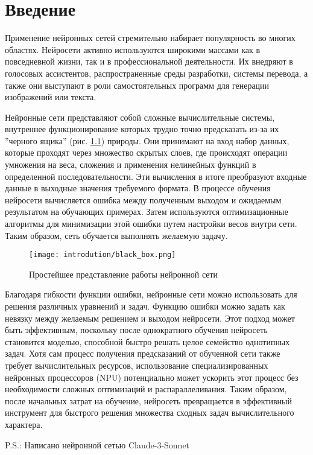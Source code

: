 \chapter{Введение}

Применение нейронных сетей стремительно набирает популярность во многих областях.
Нейросети активно используются широкими массами как в повседневной жизни, так и в
профессиональной деятельности. Их внедряют в голосовых ассистентов, распространенные
среды разработки, системы перевода, а также они выступают в роли самостоятельных
программ для генерации изображений или текста.

Нейронные сети представляют собой сложные вычислительные системы, внутреннее
функционирование которых трудно точно предсказать из-за их ''черного ящика''
(рис. \ref{fig:black_box}) природы. Они принимают на вход набор данных, которые
проходят через множество скрытых слоев, где происходят операции умножения на веса,
сложения и применения нелинейных функций в определенной последовательности.
Эти вычисления в итоге преобразуют входные данные в выходные значения требуемого
формата. В процессе обучения нейросети вычисляется ошибка между полученным выходом
и ожидаемым результатом на обучающих примерах. Затем используются оптимизационные 
алгоритмы для минимизации этой ошибки путем настройки весов внутри сети. 
Таким образом, сеть обучается выполнять желаемую задачу.

\begin{figure}[h]
    \texttt{[image: introdution/black\_box.png]}
    \caption{Простейшее представление работы нейронной сети}
    \label{fig:black_box}
\end{figure}

Благодаря гибкости функции ошибки, нейронные сети можно использовать для решения
различных уравнений и задач. Функцию ошибки можно задать как невязку между желаемым
решением и выходом нейросети. Этот подход может быть эффективным, поскольку после
однократного обучения нейросеть становится моделью, способной быстро решать целое
семейство однотипных задач. Хотя сам процесс получения предсказаний от обученной
сети также требует вычислительных ресурсов, использование специализированных нейронных
процессоров (NPU) потенциально может ускорить этот процесс без необходимости сложных
оптимизаций и распараллеливания. Таким образом, после начальных затрат на обучение,
нейросеть превращается в эффективный инструмент для быстрого решения множества сходных
задач вычислительного характера.

P.S.: Написано нейронной сетью Claude-3-Sonnet